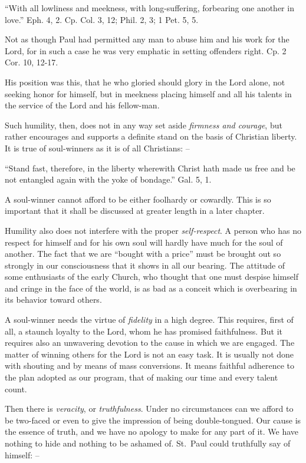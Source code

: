\documentclass[
]{book}
\begin{document}
``With all lowliness and meekness, with long-suffering, forbearing one another in love.'' Eph. 4, 2. Cp. Col. 3, 12; Phil. 2, 3; 1 Pet. 5, 5.

Not as though Paul had permitted any man to abuse him and his work for the Lord, for in such a case he was very emphatic in setting offenders right. Cp. 2 Cor. 10, 12-17.

His position was this, that he who gloried should glory in the Lord alone, not seeking honor for himself, but in meekness placing himself and all his talents in the service of the Lord and his fellow-man.

Such humility, then, does not in any way set aside \emph{firmness and courage}, but rather encourages and supports a definite stand on the basis of Christian liberty. It is true of soul-winners as it is of all Christians: --

``Stand fast, therefore, in the liberty wherewith Christ hath made us free and be not entangled again with the yoke of bondage.'' Gal. 5, 1.

A soul-winner cannot afford to be either foolhardy or cowardly. This is so important that it shall be discussed at greater length in a later chapter.

Humility also does not interfere with the proper \emph{self-respect}. A person who has no respect for himself and for his own soul will hardly have much for the soul of another. The fact that we are ``bought with a price'' must be brought out so strongly in our consciousness that it shows in all our bearing. The attitude of some enthusiasts of the early Church, who thought that one must despise himself and cringe in the face of the world, is as bad as a conceit which is overbearing in its behavior toward others.

A soul-winner needs the virtue of \emph{fidelity} in a high degree. This requires, first of all, a staunch loyalty to the Lord, whom he has promised faithfulness. But it requires also an unwavering devotion to the cause in which we are engaged. The matter of winning others for the Lord is not an easy task. It is usually not done with shouting and by means of mass conversions. It means faithful adherence to the plan adopted as our program, that of making our time and every talent count.

Then there is \emph{veracity}, or \emph{truthfulness}. Under no circumstances can we afford to be two-faced or even to give the impression of being double-tongued. Our cause is the essence of truth, and we have no apology to make for any part of it. We have nothing to hide and nothing to be ashamed of. St.~Paul could truthfully say of himself: --
\end{document}
